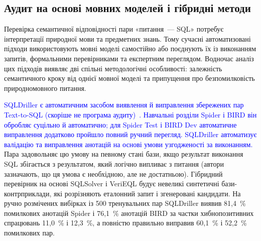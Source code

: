 \documentclass[a4paper,14pt,oneside]{extreport}
\begin{document}
\subsection{Аудит на основі мовних моделей і гібридні методи}
\label{subsec:llm-audit}

Перевірка семантичної відповідності пари «питання~--- SQL» потребує інтерпретації природної мови та предметних знань. Тому сучасні автоматизовані підходи використовують мовні моделі самостійно або поєднують їх із виконанням запитів, формальними перевірниками та експертним переглядом. Водночас аналіз цих підходів виявляє дві спільні методологічні особливості: залежність семантичного кроку від однієї мовної моделі та припущення про безпомилковість природномовного питання.

\textcolor{blue}{SQLDriller є автоматичним засобом виявлення й виправлення збережених пар Text-to-SQL (скоріше не програма аудиту)~\cite{yang2025sqldriller}. Навчальні розділи Spider і BIRD він обробляє суцільно й автоматично; для Spider Test і BIRD Dev автоматичне виправлення додатково пройшло повний ручний перегляд. SQLDriller автоматизує валідацію та виправлення анотацій на основі умови узгодженості за виконанням.} Пара задовольняє цю умову на певному стані бази, якщо результат виконання SQL збігається з результатом, який логічно випливає з питання (автори зазначають, що ця умова є необхідною, але не достатньою). Гібридний перевірник на основі SQLSolver і VeriEQL будує невеликі синтетичні бази-контрприклади, які розрізняють еталонний запит і згенеровані кандидати. На ручно розмічених вибірках із 500 тренувальних пар SQLDriller виявив 81,4~\% помилкових анотацій Spider і 76,1~\% анотацій BIRD за частки хибнопозитивних спрацювань 11,0~\% і 12,3~\%, а повністю правильно виправив 60,1~\% і 52,2~\% помилкових пар.
\end{document}
